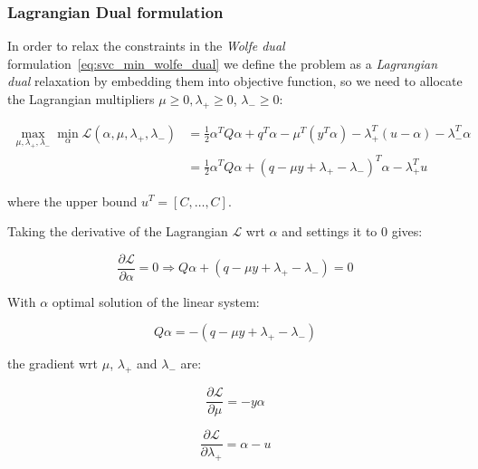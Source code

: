 \subsubsection{Lagrangian Dual formulation}

In order to relax the constraints in the \emph{Wolfe dual} formulation~\eqref{eq:svc_min_wolfe_dual} we define the problem as a \emph{Lagrangian dual} relaxation by embedding them into objective function, so we need to allocate the Lagrangian multipliers $\mu \geq 0, \lambda_+ \geq 0$, $\lambda_- \geq 0$:

\begin{equation} \label{eq:svc_lagrangian_dual}
	\begin{aligned}
		    \max_{\mu,\lambda_+,\lambda_-} \min_{\alpha} \mathcal{L}(\alpha,\mu,\lambda_+,\lambda_-) &= \frac{1}{2} \alpha^T Q\alpha+q^T\alpha - \mu^T (y^T \alpha) - \lambda_+^T (u - \alpha) - \lambda_-^T \alpha \\
    &= \frac{1}{2} \alpha^T Q\alpha + (q - \mu y + \lambda_+ - \lambda_-)^T \alpha - \lambda_+^T u
	\end{aligned}
\end{equation}

where the upper bound $u^T = [C, \dots, C]$.

Taking the derivative of the Lagrangian $\mathcal{L}$ wrt $\alpha$ and settings it to 0 gives:

\begin{equation} \label{eq:svc_lagrangian_der_a}
	\frac{\partial \mathcal{L}}{\partial \alpha}=0\Rightarrow Q \alpha + (q - \mu y + \lambda_+ - \lambda_-) = 0
\end{equation}

With $\alpha$ optimal solution of the linear system:

\begin{equation} \label{eq:svc_lagrangian_sol}
    Q \alpha = - (q - \mu y + \lambda_+ - \lambda_-)
\end{equation}

the gradient wrt $\mu$, $\lambda_+$ and $\lambda_-$ are:

\begin{equation} \label{eq:svc_lagrangian_der_mu}
	\frac{\partial \mathcal{L}}{\partial \mu}=-y \alpha
\end{equation}

\begin{equation} \label{eq:svc_lagrangian_der_lp}
	\frac{\partial \mathcal{L}}{\partial \lambda_+}=\alpha - u
\end{equation}

